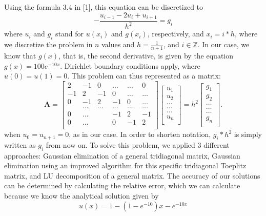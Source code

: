 \documentclass[10pt,a4paper]{article}
\begin{document}
Using the formula 3.4 in [1], this equation can be discretized to 
$$-
\frac{u_{i-1}-2u_{i}+u_{i+1}}{h^2} = g_{i}$$
where $u_{i}$ and $g_{i}$ stand for $u(x_{i})$ and $g(x_{i})$, respectively, and $x_{i}=i*h$, where we discretize the problem in $n$ values and  $h=\frac{1}{n+1}$, and $i  \in  \mathbb{Z}$.
In our case, we know that $g(x)$, that is, the second derivative, is given by the equation $g(x) = 100e^{-10x}$. Dirichlet boundary conditions apply, where $u(0)=u(1)=0$.
This problem can thus represented as a matrix:
\[
    \mathbf{A} = \begin{bmatrix}
                           2& -1& 0 &\dots   & \dots &0 \\
                           -1 & 2 & -1 &0 &\dots &\dots \\
                           0&-1 &2 & -1 & 0 & \dots \\
                           & \dots   & \dots &\dots   &\dots & \dots \\
                           0&\dots   &  &-1 &2& -1 \\
                           0&\dots    &  & 0  &-1 & 2 \\
                      \end{bmatrix}\begin{bmatrix}
                           u_1\\
                           u_2\\
                           \dots \\
                          \dots  \\
                          \dots \\
                           u_n\\
                      \end{bmatrix}
  =h^2
\begin{bmatrix}
                           {g}_1\\
                           {g}_2\\
                           \dots \\
                           \dots \\
                          \dots \\
                           {g}_n\\
                      \end{bmatrix}.
\]
when $u_{0}=u_{n+1}=0$, as in our case. In order to shorten notation, $g_i*h^2$ is simply written as  $g_i$ from now on.
To solve this problem, we applied 3 different approaches: Gaussian elimination of a general tridiagonal matrix, Gaussian elimination using an improved algorithm for this specific tridiagonal Toeplitz matrix, and LU decomposition of a general matrix. The accuracy of our solutions can be determined by calculating the relative error, which we can calculate because we know the analytical solution given by 
$$u(x)=1-(1-e^{-10})x-e^{-10x}$$
\end{document}

